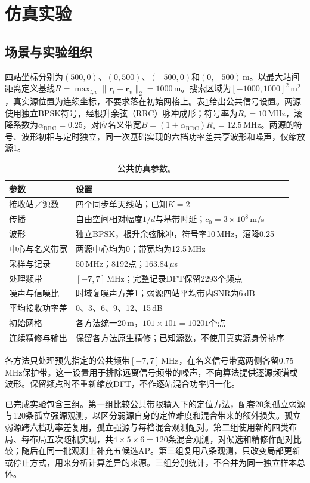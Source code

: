 \section{仿真实验}\label{sec:experiments}
\subsection{场景与实验组织}
四站坐标分别为$(500,0)$、$(0,500)$、$(-500,0)$和$(0,-500)$\,m。以最大站间距离定义基线$R=\max_{l,v}\|\bm r_l-\bm r_v\|_2=1000$\,m。搜索区域为$[-1000,1000]^2$\,m$^2$，真实源位置为连续坐标，不要求落在初始网格上。表\ref{tab:scenario}给出公共信号设置。两源使用独立BPSK符号，经根升余弦（RRC）脉冲成形；符号率为$R_s=10$\,MHz，滚降系数为$\alpha_{\mathrm{RRC}}=0.25$，对应名义带宽$B=(1+\alpha_{\mathrm{RRC}})R_s=12.5$\,MHz。两源的符号、波形初相与定时独立，同一次基础实现的六档功率差共享波形和噪声，仅缩放源1。

\begin{table}[htbp]\centering\small
\caption{公共仿真参数。}\label{tab:scenario}
\begin{tabularx}{.95\linewidth}{@{}lX@{}}\toprule
参数 & 设置\\\midrule
接收站／源数 & 四个同步单天线站；已知$K=2$\\
传播 & 自由空间相对幅度$1/d$与基带时延；$c_0=3\times10^8$\,m/s\\
波形 & 独立BPSK，根升余弦脉冲，符号率10\,MHz，滚降0.25\\
中心与名义带宽 & 两源中心均为0；带宽均为12.5\,MHz\\
采样与记录 & 50\,MHz；8192点；163.84\,$\mu$s\\
处理频带 & $[-7,7]$\,MHz；完整记录DFT保留2293个频点\\
噪声与信噪比 & 时域复噪声方差1；弱源四站平均带内SNR为6\,dB\\
平均接收功率差 & 0、3、6、9、12、15\,dB\\
初始网格 & 各方法统一20\,m，$101\times101=10201$个点\\
连续精修与输出 & 保留各方法原生精修；已知源数，不使用真实源身份排序\\\bottomrule
\end{tabularx}
\end{table}

各方法只处理预先指定的公共频带$[-7,7]$\,MHz，在名义信号带宽两侧各留0.75\,MHz保护带。这一设置用于排除远离信号频带的噪声，不向算法提供逐源频谱或波形。保留频点时不重新缩放DFT，不作逐站混合功率归一化。

已完成实验包含三组。第一组比较公共带限输入下的定位方法，配套20条孤立弱源与120条孤立强源观测，以区分弱源自身的定位难度和混合带来的额外损失。孤立弱源跨六档功率差复用，孤立强源与每档混合观测配对。第二组使用新的四类布局、每布局五次随机实现，共$4\times5\times6=120$条混合观测，对候选和精修作配对比较；随后在同一批观测上补充五候选AP。第三组复用八条观测，只改变局部更新或停止方式，用来分析计算差异的来源。三组分别统计，不合并为同一独立样本总体。

